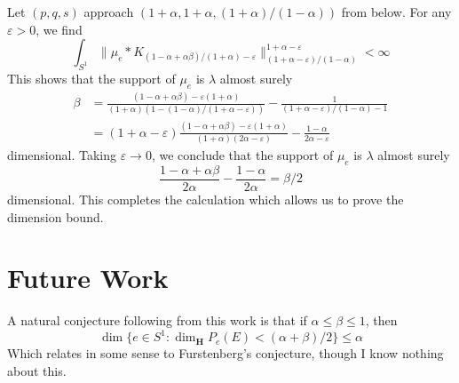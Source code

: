 \documentclass{article}
\theoremstyle{plain}
\theoremstyle{remark}
\theoremstyle{definition}
\begin{document}
Let $(p,q,s)$ approach $(1 + \alpha, 1 + \alpha, (1 + \alpha)/(1 - \alpha))$ from below. For any $\varepsilon > 0$, we find
%
\[ \int_{S^1}  \| \mu_e * K_{(1 - \alpha + \alpha \beta)/(1 + \alpha) - \varepsilon} \|_{(1 + \alpha - \varepsilon)/(1 - \alpha)}^{1 + \alpha - \varepsilon} < \infty \]
%
This shows that the support of $\mu_e$ is $\lambda$ almost surely
%
\begin{align*}
	\beta &= \frac{(1 - \alpha + \alpha \beta) - \varepsilon(1 + \alpha)}{(1 + \alpha)(1 - (1 - \alpha)/(1 + \alpha - \varepsilon))} - \frac{1}{(1 + \alpha - \varepsilon)/(1 - \alpha) - 1}\\
	&= (1 + \alpha - \varepsilon) \frac{(1 - \alpha + \alpha \beta) - \varepsilon(1 + \alpha)}{(1 + \alpha)(2\alpha - \varepsilon)} - \frac{1 - \alpha}{2\alpha - \varepsilon}
\end{align*}
%
dimensional. Taking $\varepsilon \to 0$, we conclude that the support of $\mu_e$ is $\lambda$ almost surely
%
\[ \frac{1 - \alpha + \alpha \beta}{2\alpha} - \frac{1 - \alpha}{2\alpha} = \beta / 2 \]
%
dimensional. This completes the calculation which allows us to prove the dimension bound.

\section{Future Work}

A natural conjecture following from this work is that if $\alpha \leq \beta \leq 1$, then
%
\[ \dim \{ e \in S^1: \dim_{\mathbf{H}} P_e(E) < (\alpha + \beta)/2 \} \leq \alpha \]
%
Which relates in some sense to Furstenberg's conjecture, though I know nothing about this.

\begin{comment}

\section{Besov Spaces}

Recall the Schwarz function $\varphi$ used to prove the Mihlin multiplier theorem. We now define functions $\varphi_k$ such that
%
\[ \widehat{\varphi_n}(\xi) = \varphi(2^{-n} \xi)\ \ \ \ \ \ \ \ \widehat{\psi}(\xi) = 1 - \sum_{n = 1}^\infty \varphi(2^{-n} \xi) \]
%
Thus $\varphi_n$ essentially covers the annulus $2^{n-1} \leq |\xi| \leq 2^{n+1}$, and the function $\psi$ covers the remaining low frequency parts covered in the frequency ball of radius 2. We have
%
\[ \varphi_n(\xi) = \widecheck{\varphi_{2^{-n}}}(\xi) = 2^{dn} \widecheck{\varphi}(2^n \xi) \]
%
Given $s \in \mathbf{R}$, and $1 \leq p, q \leq \infty$, we write
%
\[ \| f \|_{pq}^s = \| \psi * f \|_p + \left( \sum_{n = 1}^\infty (2^{sn} \| \varphi_k * f \|_p)^q \right)^{1/q} \]
%
The convolution $\varphi_n * f$ essentially captures the portion of $f$ whose frequencies lie in the annulus $2^{n-1} \leq |\xi| \leq 2^{n+1}$

\end{comment}
\end{document}
